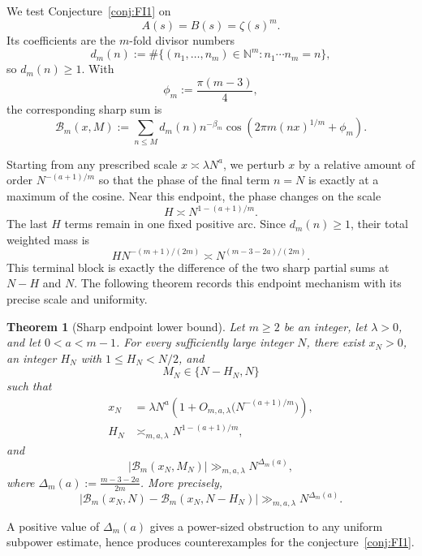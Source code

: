 \documentclass[11pt]{amsart}
\theoremstyle{plain}
\newtheorem{theorem}{Theorem}[section]
\theoremstyle{definition}
\theoremstyle{remark}
\newcommand{\Bcal}{\mathcal B}
\numberwithin{equation}{section}
\begin{document}
We test Conjecture~\ref{conj:FI1} on
\[
  A(s)=B(s)=\zeta(s)^m.
\]
Its coefficients are the $m$-fold divisor numbers
\begin{equation}\label{eq:dm-definition-intro}
  d_m(n)
  :=\#\{(n_1,\ldots,n_m)\in\mathbb N^m:n_1\cdots n_m=n\},
\end{equation}
so $d_m(n)\ge1$.  With
\[
  \phi_m:=\frac{\pi(m-3)}4,
\]
the corresponding sharp sum is
\begin{equation}\label{eq:Bm-intro}
  \Bcal_m(x,M)
  :=\sum_{n\le M}d_m(n)n^{-\beta_m}
  \cos\!\left(2\pi m(nx)^{1/m}+\phi_m\right).
\end{equation}

Starting from any prescribed scale $x\asymp \lambda N^a$, we perturb $x$ by a relative amount of order $N^{-(a+1)/m}$ so that the phase of the final term $n=N$ is exactly at a maximum of the cosine. Near this endpoint, the phase changes on the scale 
\[ H\asymp N^{1-(a+1)/m}. \] 
The last $H$ terms remain in one fixed positive arc. Since $d_m(n)\ge1$, their total weighted mass is 
\[ HN^{-(m+1)/(2m)} \asymp N^{(m-3-2a)/(2m)}. \]
This terminal block is exactly the difference of the two sharp partial sums at $N-H$ and $N$. The following theorem records this endpoint mechanism with its precise scale and uniformity.


\begin{theorem}[Sharp endpoint lower bound]\label{thm:main}
Let $m\ge2$ be an integer, let $\lambda>0$, and let $0<a<m-1$.  For every
sufficiently large integer $N$, there exist $x_N>0$, an integer $H_N$ with
$1\le H_N<N/2$, and
\[
  M_N\in\{N-H_N,N\}
\]
such that
\begin{align}
  x_N
  &=\lambda N^a\left(1+O_{m,a,\lambda}
    \bigl(N^{-(a+1)/m}\bigr)\right),\label{eq:main-x}\\
  H_N
  &\asymp_{m,a,\lambda}N^{1-(a+1)/m},\label{eq:main-H}
\end{align}
and
\begin{equation}\label{eq:main-lower}
  |\Bcal_m(x_N,M_N)|
  \gg_{m,a,\lambda}N^{\Delta_m(a)},
\end{equation}
where $\Delta_m(a):=\frac{m-3-2a}{2m}$. More precisely,
\begin{equation}\label{eq:main-block}
  |\Bcal_m(x_N,N)-\Bcal_m(x_N,N-H_N)|
  \gg_{m,a,\lambda}N^{\Delta_m(a)}.
\end{equation}
\end{theorem}

A positive value of $\Delta_m(a)$ gives a power-sized obstruction to any uniform subpower estimate, hence produces counterexamples for the conjecture~\ref{conj:FI1}.
\end{document}
